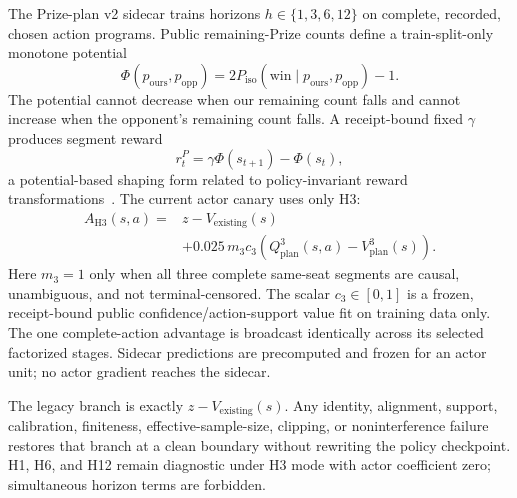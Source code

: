 The Prize-plan v2 sidecar trains horizons $h\in\{1,3,6,12\}$ on complete,
recorded, chosen action programs. Public remaining-Prize counts define a
train-split-only monotone potential
\begin{equation}
  \Phi(p_{\mathrm{ours}},p_{\mathrm{opp}})
    =2P_{\mathrm{iso}}(\mathrm{win}\mid p_{\mathrm{ours}},p_{\mathrm{opp}})-1.
\end{equation}
The potential cannot decrease when our remaining count falls and cannot
increase when the opponent's remaining count falls. A receipt-bound fixed
$\gamma$ produces segment reward
\begin{equation}
  r_t^{P}=\gamma\Phi(s_{t+1})-\Phi(s_t),
\end{equation}
a potential-based shaping form related to policy-invariant reward
transformations~\cite{ng1999policy}. The current actor canary uses only H3:
\begin{equation}
\begin{split}
 A_{\mathrm{H3}}(s,a) ={}& z-V_{\mathrm{existing}}(s)\\
 &+0.025\,m_3c_3\left(Q_{\mathrm{plan}}^3(s,a)-V_{\mathrm{plan}}^3(s)\right).
\end{split}
\label{eq:h3}
\end{equation}
Here $m_3=1$ only when all three complete same-seat segments are causal,
unambiguous, and not terminal-censored. The scalar $c_3\in[0,1]$ is a frozen,
receipt-bound public confidence/action-support value fit on training data only.
The one complete-action advantage is broadcast identically across its selected
factorized stages. Sidecar predictions are precomputed and frozen for an actor
unit; no actor gradient reaches the sidecar.

The legacy branch is exactly $z-V_{\mathrm{existing}}(s)$. Any identity,
alignment, support, calibration, finiteness, effective-sample-size, clipping,
or noninterference failure restores that branch at a clean boundary without
rewriting the policy checkpoint. H1, H6, and H12 remain diagnostic under H3
mode with actor coefficient zero; simultaneous horizon terms are forbidden.
